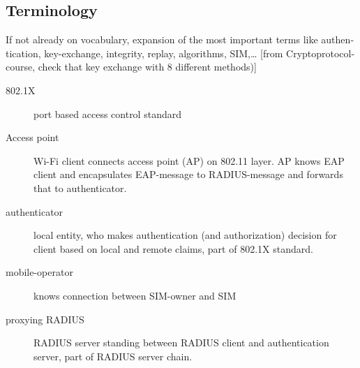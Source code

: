 \documentclass[12pt,a4paper,english]{tutthesis}
\begin{document}
\begin{otherlanguage}{english}

\chapter*{Terminology}
\markboth{}{}                                %

If not already on vocabulary, expansion of the most important terms like
authentication, key-exchange, integrity, replay, algorithms, SIM,\ldots{}
[from Cryptoprotocol-course, check that key exchange with 8 different methods)]

\begin{description}
\item[{802.1X}] port based access control standard
\item[{Access point}] Wi-Fi client connects access point (AP) on 802.11
layer. AP knows EAP client and encapsulates EAP-message
to RADIUS-message and forwards that to
authenticator.
\end{description}
\begin{description}
\item[{authenticator}] local entity, who makes authentication (and
authorization) decision for client based on local and remote
claims, part of 802.1X standard.
\end{description}
\begin{description}
\item[{mobile-operator}] knows connection between SIM-owner and SIM
\end{description}
\begin{description}
\item[{proxying RADIUS}] RADIUS server standing between RADIUS
client and authentication server, part of RADIUS server chain.
\end{description}



\if@twoside
\cleardoublepage
\fi

\newpage             %
\setcounter{page}{1} %
\renewcommand{\chaptername}{} %


\end{otherlanguage}
\end{document}
